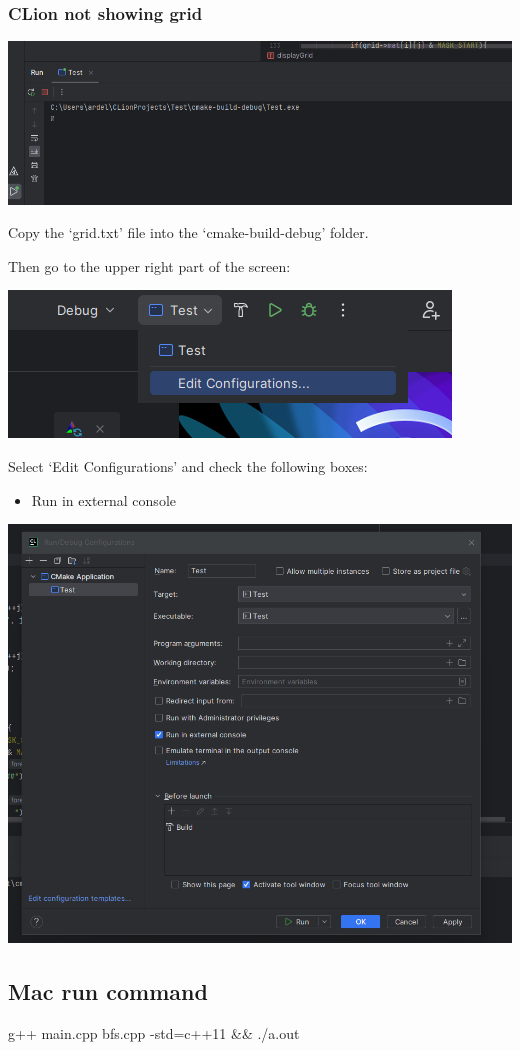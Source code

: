 \documentclass[../en-fa-lab.tex]{subfiles}
\begin{document}
\subsubsection{CLion not showing grid}\label{clion-not-showing-grid}

\includegraphics[width=\textwidth,alt={A screenshot of a computer Description automatically generated}]{./Resources/tutorial_lab9/image25.png}

Copy the `grid.txt' file into the `cmake-build-debug' folder.

Then go to the upper right part of the screen:

\includegraphics[width=\textwidth,alt={A screenshot of a computer Description automatically generated}]{./Resources/tutorial_lab9/image26.png}

Select `Edit Configurations' and check the following boxes:

\begin{itemize}
\item
  Run in external console
\end{itemize}

\includegraphics[width=\textwidth,alt={A screenshot of a computer Description automatically generated}]{./Resources/tutorial_lab9/image27.png}

\subsection{Mac run command}\label{mac-run-command}

g++ main.cpp bfs.cpp -std=c++11 \&\& ./a.out
\end{document}
